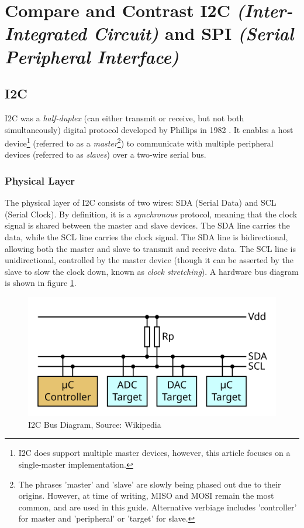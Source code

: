 \documentclass[main.tex]{subfiles}
\begin{document}
\section{Compare and Contrast I2C \textit{(Inter-Integrated Circuit)} and SPI \textit{(Serial Peripheral Interface)}}
\spoilerline

\subsection{I2C}
I2C was a \textit{half-duplex} (can either transmit or receive, but not both simultaneously) digital protocol developed by Phillips in 1982 \cite{sparkfun_i2c_history}. It enables a host device\footnote{I2C does support multiple master devices, however, this article focuses on a single-master implementation.} (referred to as a \textit{master}\footnote{The phrases 'master' and 'slave' are slowly being phased out due to their origins. However, at time of writing, MISO and MOSI remain the most common, and are used in this guide. Alternative verbiage includes 'controller' for master and 'peripheral' or 'target' for slave.}) to communicate with multiple peripheral devices (referred to as \textit{slaves}) over a two-wire serial bus. 
\subsubsection{Physical Layer}
The physical layer of I2C consists of two wires: SDA (Serial Data) and SCL (Serial Clock). By definition, it is a \textit{synchronous} protocol, meaning that the clock signal is shared between the master and slave devices. The SDA line carries the data, while the SCL line carries the clock signal. The SDA line is bidirectional, allowing both the master and slave to transmit and receive data. The SCL line is unidirectional, controlled by the master device (though it can be asserted by the slave to slow the clock down, known as \textit{clock stretching}). A hardware bus diagram is shown in figure \ref{fig:i2c_bus}.

\begin{figure}[H]
    \centering
    \includegraphics[scale=0.09]{images/I2C_controller-target.png}
    \caption{I2C Bus Diagram, Source: Wikipedia \cite{wikipedia_i2c_bus_image}}
    \label{fig:i2c_bus}
\end{figure}
\end{document}
